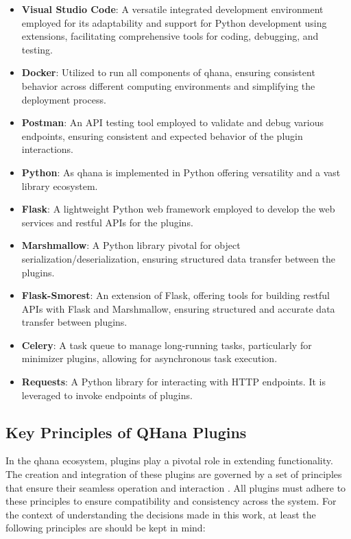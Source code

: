 \documentclass[
  a4paper,  %
  twoside,  %
  bibliography=totoc,
  headsepline,
  cleardoublepage=empty,
  parskip=half,
  draft=false
]{scrbook}
\begin{document}
\begin{itemize}
    \item \textbf{Visual Studio Code}: A versatile integrated development environment employed for its adaptability and support for Python development using extensions, facilitating comprehensive tools for coding, debugging, and testing.

    \item \textbf{Docker}: Utilized to run all components of \gls{qhana}, ensuring consistent behavior across different computing environments and simplifying the deployment process.

    \item \textbf{Postman}: An API testing tool employed to validate and debug various endpoints, ensuring consistent and expected behavior of the plugin interactions.

    \item \textbf{Python}: As \gls{qhana} is implemented in Python offering versatility and a vast library ecosystem.

    \item \textbf{Flask}: A lightweight Python web framework employed to develop the web services and \gls{rest}ful APIs for the plugins.

    \item \textbf{Marshmallow}: A Python library pivotal for object serialization/deserialization, ensuring structured data transfer between the plugins.

    \item \textbf{Flask-Smorest}: An extension of Flask, offering tools for building \gls{rest}ful APIs with Flask and Marshmallow, ensuring structured and accurate data transfer between plugins.

    \item \textbf{Celery}: A task queue to manage long-running tasks, particularly for minimizer plugins, allowing for asynchronous task execution.

    \item \textbf{Requests}: A Python library for interacting with HTTP endpoints. It is leveraged to invoke endpoints of plugins.
\end{itemize}

\subsection{Key Principles of QHana Plugins}

In the \gls{qhana} ecosystem, plugins play a pivotal role in extending functionality.
The creation and integration of these plugins are governed by a set of principles that ensure their seamless operation and interaction \cite{FabianBuehler}.
All plugins must adhere to these principles to ensure compatibility and consistency across the system.
For the context of understanding the decisions made in this work, at least the following principles are should be kept in mind:
\end{document}
